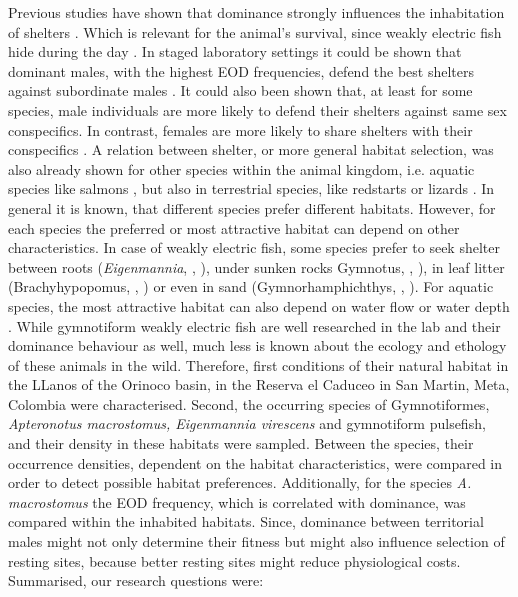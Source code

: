 Previous studies have shown that dominance strongly influences the inhabitation of shelters \citep{raab2019}.
Which is relevant for the animal's survival, since weakly electric fish hide during the day \citep{Hopkins_74}.     
In staged laboratory settings it could be shown that dominant males, with the highest EOD frequencies, defend the best shelters against subordinate males \citep{raab2019}.
It could also been shown that, at least for some species, male individuals are more likely to defend their shelters against same sex conspecifics. In contrast, females are more likely to share shelters with their conspecifics \citep{dunlap2002retreat}.
A relation between shelter, or more general habitat selection, was also already shown for other species within the animal kingdom, i.e. aquatic species like salmons \citep{redsalmon1995}, but also in terrestrial species, like redstarts \citep{sherry1989redstarts} or lizards \citep{downes1998heat}.
In general it is known, that different species prefer different habitats. However, for each species the preferred or most attractive habitat can depend on other characteristics.
In case of weakly electric fish, some species prefer to seek shelter between roots (\textit{Eigenmannia}, \citeauthor{Hopkins_74}, \citeyear{Hopkins_74}), under sunken rocks Gymnotus, \citeauthor{westby1988ecology}, \citeyear{westby1988ecology}), in leaf litter (Brachyhypopomus, \citeauthor{hagedorn1988ecology}, \citeyear{hagedorn1988ecology}) or even in sand (Gymnorhamphichthys, \citeauthor{lissmann1965activity}, \citeyear{lissmann1965activity}).
For aquatic species, the most attractive habitat can also depend on water flow or water depth \citep{aadland1993stream}.
While gymnotiform weakly electric fish are well researched in the lab and their dominance behaviour as well, much less is known about the ecology and ethology of these animals in the wild. 
Therefore, first conditions of their natural habitat in the LLanos of the Orinoco basin, in the Reserva el Caduceo in San Martin, Meta, Colombia were characterised. 
Second, the occurring species of Gymnotiformes, \textit{Apteronotus macrostomus, Eigenmannia virescens} and gymnotiform pulsefish, and their density in these habitats were sampled.
Between the species, their occurrence densities, dependent on the habitat characteristics, were compared in order to detect possible habitat preferences.
Additionally, for the species \textit{A. macrostomus} the EOD frequency, which is correlated with dominance, was compared within the inhabited habitats. Since, dominance between territorial males might not only determine their fitness but might also influence selection of resting sites, because better resting sites might reduce physiological costs.
Summarised, our research questions were:\\

